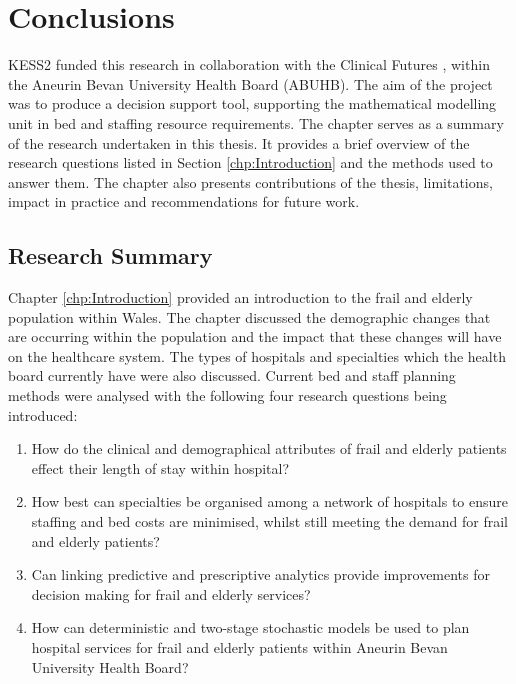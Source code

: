 \documentclass[../thesis.tex]{subfiles}
\begin{document}
\chapter{Conclusions}\label{chp:Discussion}
\onehalfspacing
KESS2 funded this research \cite{KESS2023} in collaboration with the Clinical Futures \cite{UniAneurinBevanHealthBoardc}, within the Aneurin Bevan University Health Board (ABUHB). The aim of the project was to produce a decision support tool, supporting the mathematical modelling unit in bed and staffing resource requirements. The chapter serves as a summary of the research undertaken in this thesis. It provides a brief overview of the research questions listed in Section \ref{chp:Introduction} and the methods used to answer them. The chapter also presents contributions of the thesis, limitations, impact in practice and recommendations for future work.


\section{Research Summary}
Chapter \ref{chp:Introduction} provided an introduction to the frail and elderly population within Wales. The chapter discussed the demographic changes that are occurring within the population and the impact that these changes will have on the healthcare system. The types of hospitals and specialties which the health board currently have were also discussed. Current bed and staff planning methods were analysed with the following four research questions being introduced:


\begin{enumerate}
    \item How do the clinical and demographical attributes of frail and elderly patients effect their length of stay within hospital?    
    \item How best can specialties be organised among a network of hospitals to ensure staffing and bed costs are minimised, whilst still meeting the demand for frail and elderly patients?
    \item Can linking predictive and prescriptive analytics provide improvements for decision making for frail and elderly services?  
    \item How can deterministic and two-stage stochastic models be used to plan hospital services for frail and elderly patients within Aneurin Bevan University Health Board?
\end{enumerate}
\end{document}
